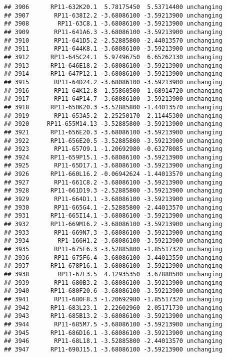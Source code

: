 \documentclass[]{article}
\begin{document}
\begin{verbatim}
## 3906      RP11-632K20.1  5.78175450  5.53714400 unchanging
## 3907       RP11-638I2.2 -3.68086100 -3.59213900 unchanging
## 3908        RP11-63C8.1 -3.68086100 -3.59213900 unchanging
## 3909       RP11-641A6.3 -3.68086100 -3.59213900 unchanging
## 3910       RP11-641D5.2 -2.52885800 -2.44013570 unchanging
## 3911       RP11-644K8.1 -3.68086100 -3.59213900 unchanging
## 3912      RP11-645C24.1  5.97496750  6.65262130 unchanging
## 3913      RP11-646E18.2 -3.68086100 -3.59213900 unchanging
## 3914      RP11-647P12.1 -3.68086100 -3.59213900 unchanging
## 3915       RP11-64D24.2 -3.68086100 -3.59213900 unchanging
## 3916       RP11-64K12.8  1.55860500  1.68914720 unchanging
## 3917       RP11-64P14.7 -3.68086100 -3.59213900 unchanging
## 3918      RP11-650K20.3 -3.52885800 -1.44013570 unchanging
## 3919       RP11-653A5.2  2.25250170  2.11445300 unchanging
## 3920     RP11-655M14.13 -3.52885800 -3.59213900 unchanging
## 3921      RP11-656E20.3 -3.68086100 -3.59213900 unchanging
## 3922      RP11-656E20.5 -3.52885800 -3.59213900 unchanging
## 3923       RP11-657O9.1 -1.20692980 -0.63278085 unchanging
## 3924      RP11-659P15.1 -3.68086100 -3.59213900 unchanging
## 3925       RP11-65D17.1 -3.68086100 -3.59213900 unchanging
## 3926      RP11-660L16.2 -0.06942624 -1.44013570 unchanging
## 3927       RP11-661C8.2 -3.68086100 -3.59213900 unchanging
## 3928      RP11-661D19.3 -2.52885800 -3.59213900 unchanging
## 3929       RP11-664D1.1 -3.68086100 -3.59213900 unchanging
## 3930       RP11-665G4.1 -2.52885800 -2.44013570 unchanging
## 3931      RP11-665I14.1 -3.68086100 -3.59213900 unchanging
## 3932      RP11-669M16.2 -3.68086100 -3.59213900 unchanging
## 3933       RP11-669N7.3 -3.68086100 -3.59213900 unchanging
## 3934        RP1-166H1.2 -3.68086100 -3.59213900 unchanging
## 3935       RP11-675F6.3 -3.52885800 -1.85517320 unchanging
## 3936       RP11-675F6.4 -3.68086100 -3.44013550 unchanging
## 3937      RP11-678P16.1 -3.68086100 -3.59213900 unchanging
## 3938        RP11-67L3.5  4.12935350  3.67880500 unchanging
## 3939       RP11-680B3.2 -3.68086100 -3.59213900 unchanging
## 3940      RP11-680F20.6 -3.68086100 -3.59213900 unchanging
## 3941       RP11-680F8.3 -1.20692980 -1.85517320 unchanging
## 3942      RP11-683L23.1  2.22602960  2.05171730 unchanging
## 3943      RP11-685B13.2 -3.68086100 -3.59213900 unchanging
## 3944       RP11-685M7.5 -3.68086100 -3.59213900 unchanging
## 3945      RP11-686D16.1 -3.68086100 -3.59213900 unchanging
## 3946       RP11-68L18.1 -3.52885800 -2.44013570 unchanging
## 3947      RP11-690J15.1 -3.68086100 -3.59213900 unchanging

\end{verbatim}
\end{document}
